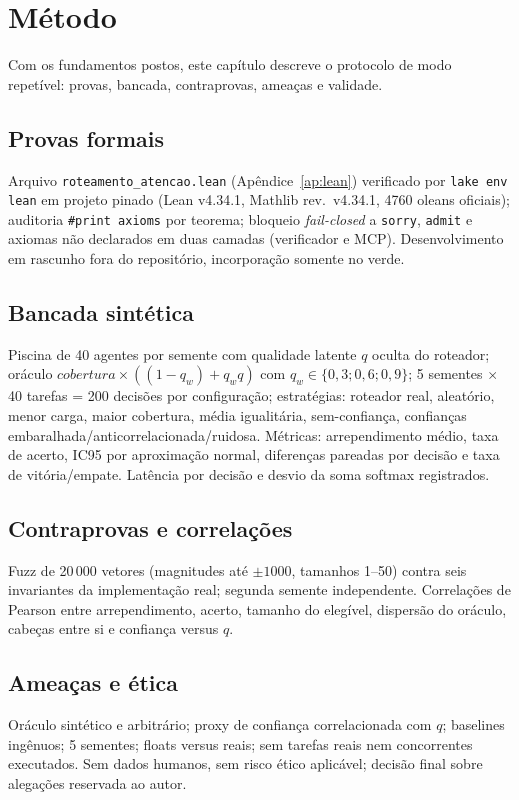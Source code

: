 \chapter{Método}
Com os fundamentos postos, este capítulo descreve o protocolo de modo repetível: provas, bancada, contraprovas, ameaças e validade.
\section{Provas formais}
Arquivo \texttt{roteamento\_atencao.lean} (Apêndice~\ref{ap:lean}) verificado por \texttt{lake env lean} em projeto pinado (Lean v4.34.1, Mathlib rev.\ v4.34.1, 4760 oleans oficiais); auditoria \texttt{\#print axioms} por teorema; bloqueio \textit{fail-closed} a \texttt{sorry}, \texttt{admit} e axiomas não declarados em duas camadas (verificador e MCP). Desenvolvimento em rascunho fora do repositório, incorporação somente no verde.
\section{Bancada sintética}
Piscina de 40 agentes por semente com qualidade latente $q$ oculta do roteador; oráculo $cobertura\times((1-q_w)+q_w q)$ com $q_w\in\{0{,}3;0{,}6;0{,}9\}$; 5 sementes $\times$ 40 tarefas = 200 decisões por configuração; estratégias: roteador real, aleatório, menor carga, maior cobertura, média igualitária, sem-confiança, confianças embaralhada/anticorrelacionada/ruidosa. Métricas: arrependimento médio, taxa de acerto, IC95 por aproximação normal, diferenças pareadas por decisão e taxa de vitória/empate. Latência por decisão e desvio da soma softmax registrados.
\section{Contraprovas e correlações}
Fuzz de 20\,000 vetores (magnitudes até $\pm1000$, tamanhos 1--50) contra seis invariantes da implementação real; segunda semente independente. Correlações de Pearson entre arrependimento, acerto, tamanho do elegível, dispersão do oráculo, cabeças entre si e confiança versus $q$.
\section{Ameaças e ética}
Oráculo sintético e arbitrário; proxy de confiança correlacionada com $q$; baselines ingênuos; 5 sementes; floats versus reais; sem tarefas reais nem concorrentes executados. Sem dados humanos, sem risco ético aplicável; decisão final sobre alegações reservada ao autor.
